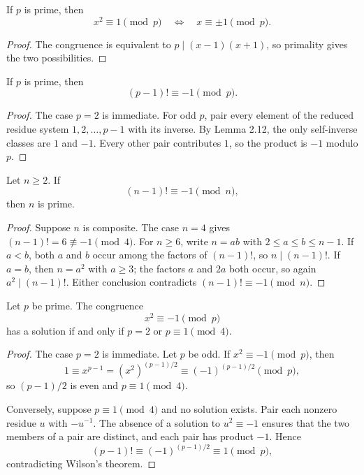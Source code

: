 \begin{lem}
If $p$ is prime, then
\[
 x^2\equiv1\pmod p
 \quad\Longleftrightarrow\quad
 x\equiv\pm1\pmod p.
\]
\end{lem}
\begin{proof}
The congruence is equivalent to $p\mid(x-1)(x+1)$, so primality gives the two possibilities.
\end{proof}

\begin{thm}
If $p$ is prime, then
\[
 (p-1)!\equiv-1\pmod p.
\]
\end{thm}
\begin{proof}
The case $p=2$ is immediate.  For odd $p$, pair every element of the reduced residue system $1,2,\ldots,p-1$ with its inverse.  By Lemma 2.12, the only self-inverse classes are $1$ and $-1$.  Every other pair contributes $1$, so the product is $-1$ modulo $p$.
\end{proof}

\begin{thm}
Let $n\ge2$.  If
\[
 (n-1)!\equiv-1\pmod n,
\]
then $n$ is prime.
\end{thm}
\begin{proof}
Suppose $n$ is composite.  The case $n=4$ gives $(n-1)!=6\not\equiv-1\pmod4$.  For $n\ge6$, write $n=ab$ with $2\le a\le b\le n-1$.  If $a<b$, both $a$ and $b$ occur among the factors of $(n-1)!$, so $n\mid(n-1)!$.  If $a=b$, then $n=a^2$ with $a\ge3$; the factors $a$ and $2a$ both occur, so again $a^2\mid(n-1)!$.  Either conclusion contradicts $(n-1)!\equiv-1\pmod n$.
\end{proof}

\begin{thm}
Let $p$ be prime.  The congruence
\[
 x^2\equiv-1\pmod p
\]
has a solution if and only if $p=2$ or $p\equiv1\pmod4$.
\end{thm}
\begin{proof}
The case $p=2$ is immediate.  Let $p$ be odd.  If $x^2\equiv-1\pmod p$, then
\[
 1\equiv x^{p-1}=(x^2)^{(p-1)/2}\equiv(-1)^{(p-1)/2}\pmod p,
\]
so $(p-1)/2$ is even and $p\equiv1\pmod4$.

Conversely, suppose $p\equiv1\pmod4$ and no solution exists.  Pair each nonzero residue $u$ with $-u^{-1}$.  The absence of a solution to $u^2\equiv-1$ ensures that the two members of a pair are distinct, and each pair has product $-1$.  Hence
\[
 (p-1)!\equiv(-1)^{(p-1)/2}\equiv1\pmod p,
\]
contradicting Wilson's theorem.
\end{proof}

